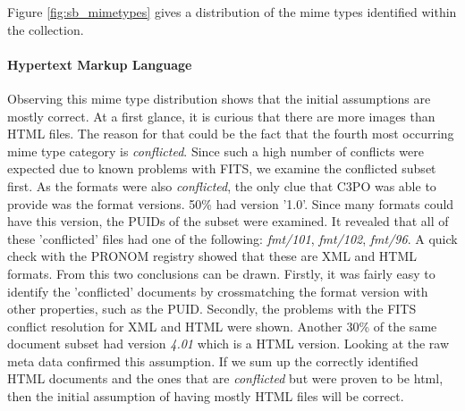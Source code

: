 Figure \ref{fig:sb_mimetypes} gives a distribution of the mime types identified within the collection.


\paragraph{Hypertext Markup Language}
Observing this mime type distribution shows that the initial assumptions are mostly correct. At a first glance, it is curious that there are more images than HTML files. The reason for that could be the fact that the fourth most occurring mime type category is \textit{conflicted}. Since such a high number of conflicts were expected due to known problems with FITS, we examine the conflicted subset first. As the formats were also \textit{conflicted}, the only clue that C3PO was able to provide was the format versions. 50\% had version '1.0'. Since many formats could have this version, the PUIDs of the subset were examined. It revealed that all of these 'conflicted' files had one of the following: \textit{fmt/101}, \textit{fmt/102}, \textit{fmt/96}. A quick check with the PRONOM registry showed that these are XML and HTML formats. From this two conclusions can be drawn. Firstly, it was fairly easy to identify the 'conflicted' documents by crossmatching the format version with other properties, such as the PUID. Secondly, the problems with the FITS conflict resolution for XML and HTML were shown. Another 30\% of the same document subset had version \textit{4.01} which is a HTML version. Looking at the raw meta data confirmed this assumption. If we sum up the correctly identified HTML documents and the ones that are \textit{conflicted} but were proven to be html, then the initial assumption of having mostly HTML files will be correct.

